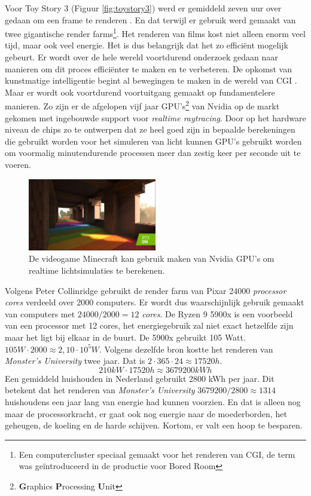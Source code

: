 \documentclass[12pt, a4paper]{article}
\begin{document}
Voor Toy Story 3 (Figuur \ref{fig:toystory3}) werd er gemiddeld zeven uur over gedaan om een frame te renderen \cite{HowToyStory3WasMade}. En dat terwijl er gebruik werd gemaakt van twee gigantische render farms\footnote{Een computercluster speciaal gemaakt voor het renderen van CGI, de term was geïntroduceerd in de productie voor Bored Room\cite{MakingOfBoredRoom}}. Het renderen van films kost niet alleen enorm veel tijd, maar ook veel energie. Het is dus belangrijk dat het zo efficiënt mogelijk gebeurt. Er wordt over de hele wereld voortdurend onderzoek gedaan naar manieren om dit proces efficiënter te maken en te verbeteren. De opkomst van kunstmatige intelligentie begint al bewegingen te maken in de wereld van CGI \cite{NeRFactor}. Maar er wordt ook voortdurend voortuitgang gemaakt op fundamentelere manieren. Zo zijn er de afgelopen vijf jaar GPU's\footnote{\textbf{G}raphics \textbf{P}rocessing \textbf{U}nit} van Nvidia op de markt gekomen met ingebouwde support voor \textit{realtime raytracing}\cite{NvidiaRTX}. Door op het hardware niveau de chips zo te ontwerpen dat ze heel goed zijn in bepaalde berekeningen die gebruikt worden voor het simuleren van licht kunnen GPU's gebruikt worden om voormalig minutendurende processen meer dan zestig keer per seconde uit te voeren. 
\begin{figure}[H]
    \centering
    \includegraphics[width=0.5\textwidth]{minecraftrtx.jpg}
    \caption{De videogame Minecraft kan gebruik maken van Nvidia GPU's om realtime lichtsimulaties te berekenen.}
    \label{fig:minecraftrtx}
\end{figure}

Volgens Peter Collinridge\cite{ScienceBehindPixarRendering} gebruikt de render farm van Pixar 24000 \textit{processor cores} verdeeld over 2000 computers. Er wordt dus waarschijnlijk gebruik gemaakt van computers met \(24000/2000=12\) \textit{cores}. De Ryzen 9 5900x is een voorbeeld van een processor met 12 cores, het energiegebruik zal niet exact hetzelfde zijn maar het ligt bij elkaar in de buurt. De 5900x gebruikt 105 Watt. \(105W\cdot 2000\approx 2,10\cdot 10^5W\). Volgens dezelfde bron kostte het renderen van \textit{Monster's University} twee jaar. Dat is \(2\cdot 365\cdot 24\approx17520h\). \[210kW \cdot 17520h\approx 3679200kWh\] Een gemiddeld huishouden in Nederland gebruikt 2800 kWh per jaar\cite{EnergieGebruik}. Dit betekent dat het renderen van \textit{Monster's University} \(3679200/2800\approx 1314\) huishoudens een jaar lang van energie had kunnen voorzien. En dat is alleen nog maar de processorkracht, er gaat ook nog energie naar de moederborden, het geheugen, de koeling en de harde schijven. Kortom, er valt een hoop te besparen.
\clearpage
\end{document}
